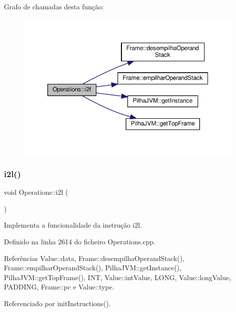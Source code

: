 Grafo de chamadas desta função\+:
\nopagebreak
\begin{figure}[H]
\begin{center}
\leavevmode
\includegraphics[width=345pt]{classOperations_a4880878630a620c325840fc7980dc131_cgraph}
\end{center}
\end{figure}
\mbox{\label{classOperations_ae5d28665a74411cbb880e3007c5405e8}} 
\subsubsection{\texorpdfstring{i2l()}{i2l()}}
{\footnotesize\ttfamily void Operations\+::i2l (\begin{DoxyParamCaption}{ }\end{DoxyParamCaption})\hspace{0.3cm}{\ttfamily [private]}}



Implementa a funcionalidade da instrução i2l. 



Definido na linha 2614 do ficheiro Operations.\+cpp.



Referências Value\+::data, Frame\+::desempilha\+Operand\+Stack(), Frame\+::empilhar\+Operand\+Stack(), Pilha\+J\+V\+M\+::get\+Instance(), Pilha\+J\+V\+M\+::get\+Top\+Frame(), I\+NT, Value\+::int\+Value, L\+O\+NG, Value\+::long\+Value, P\+A\+D\+D\+I\+NG, Frame\+::pc e Value\+::type.



Referenciado por init\+Instructions().

